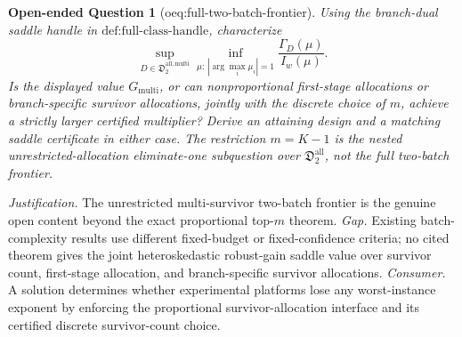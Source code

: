 \documentclass{article}
\newtheorem{openendedquestion}{Open-ended Question}
\begin{document}
\begin{openendedquestion}[oeq:full-two-batch-frontier]\label{oeq:full-two-batch-frontier}
Using the branch-dual saddle handle in \(\text{def:full-class-handle}\), characterize
\[
 \sup_{D\in\mathfrak D_2^{\mathrm{all,multi}}}
 \inf_{\mu:\,|\arg\max_i\mu_i|=1}
 \frac{\Gamma_D(\mu)}{I_w(\mu)}.
\]
Is the displayed value \(G_{\mathrm{multi}}\), or can nonproportional first-stage allocations or branch-specific survivor allocations, jointly with the discrete choice of \(m\), achieve a strictly larger certified multiplier?  Derive an attaining design and a matching saddle certificate in either case.  The restriction \(m=K-1\) is the nested unrestricted-allocation eliminate-one subquestion over \(\mathfrak D_2^{\mathrm{all}}\), not the full two-batch frontier.
\end{openendedquestion}
\par\smallskip\noindent \textit{Justification.} The unrestricted multi-survivor two-batch frontier is the genuine open content beyond the exact proportional top-\(m\) theorem. \textit{Gap.} Existing batch-complexity results use different fixed-budget or fixed-confidence criteria; no cited theorem gives the joint heteroskedastic robust-gain saddle value over survivor count, first-stage allocation, and branch-specific survivor allocations. \textit{Consumer.} A solution determines whether experimental platforms lose any worst-instance exponent by enforcing the proportional survivor-allocation interface and its certified discrete survivor-count choice.
\end{document}
